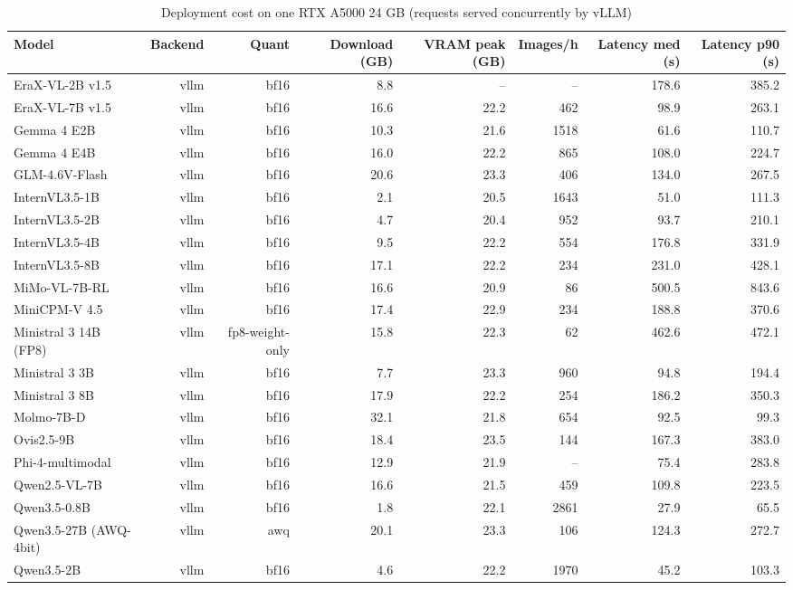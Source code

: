 \begin{table}[t]
\centering
\caption{Deployment cost on one RTX A5000 24 GB (requests served concurrently by vLLM)}
\label{tab:deploy}
\small
\begin{tabular}{lrrrrrrr}
\toprule
Model & Backend & Quant & Download (GB) & VRAM peak (GB) & Images/h & Latency med (s) & Latency p90 (s) \\
\midrule
EraX-VL-2B v1.5 & vllm & bf16 & 8.8 & – & – & 178.6 & 385.2 \\
EraX-VL-7B v1.5 & vllm & bf16 & 16.6 & 22.2 & 462 & 98.9 & 263.1 \\
Gemma 4 E2B & vllm & bf16 & 10.3 & 21.6 & 1518 & 61.6 & 110.7 \\
Gemma 4 E4B & vllm & bf16 & 16.0 & 22.2 & 865 & 108.0 & 224.7 \\
GLM-4.6V-Flash & vllm & bf16 & 20.6 & 23.3 & 406 & 134.0 & 267.5 \\
InternVL3.5-1B & vllm & bf16 & 2.1 & 20.5 & 1643 & 51.0 & 111.3 \\
InternVL3.5-2B & vllm & bf16 & 4.7 & 20.4 & 952 & 93.7 & 210.1 \\
InternVL3.5-4B & vllm & bf16 & 9.5 & 22.2 & 554 & 176.8 & 331.9 \\
InternVL3.5-8B & vllm & bf16 & 17.1 & 22.2 & 234 & 231.0 & 428.1 \\
MiMo-VL-7B-RL & vllm & bf16 & 16.6 & 20.9 & 86 & 500.5 & 843.6 \\
MiniCPM-V 4.5 & vllm & bf16 & 17.4 & 22.9 & 234 & 188.8 & 370.6 \\
Ministral 3 14B (FP8) & vllm & fp8-weight-only & 15.8 & 22.3 & 62 & 462.6 & 472.1 \\
Ministral 3 3B & vllm & bf16 & 7.7 & 23.3 & 960 & 94.8 & 194.4 \\
Ministral 3 8B & vllm & bf16 & 17.9 & 22.2 & 254 & 186.2 & 350.3 \\
Molmo-7B-D & vllm & bf16 & 32.1 & 21.8 & 654 & 92.5 & 99.3 \\
Ovis2.5-9B & vllm & bf16 & 18.4 & 23.5 & 144 & 167.3 & 383.0 \\
Phi-4-multimodal & vllm & bf16 & 12.9 & 21.9 & – & 75.4 & 283.8 \\
Qwen2.5-VL-7B & vllm & bf16 & 16.6 & 21.5 & 459 & 109.8 & 223.5 \\
Qwen3.5-0.8B & vllm & bf16 & 1.8 & 22.1 & 2861 & 27.9 & 65.5 \\
Qwen3.5-27B (AWQ-4bit) & vllm & awq & 20.1 & 23.3 & 106 & 124.3 & 272.7 \\
Qwen3.5-2B & vllm & bf16 & 4.6 & 22.2 & 1970 & 45.2 & 103.3 \\

\end{tabular}
\end{table}
